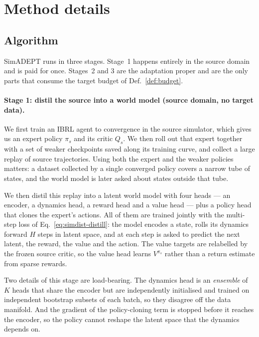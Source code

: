 \section{Method details}
\label{app:method}

\subsection{Algorithm}
\label{app:algorithm}

SimADEPT runs in three stages. Stage~1 happens entirely in the source domain and
is paid for once. Stages~2 and 3 are the adaptation proper and are the only
parts that consume the target budget of Def.~\ref{def:budget}.

\paragraph{Stage 1: distil the source into a world model (source domain, no
target data).}
We first train an IBRL agent to convergence in the source simulator, which gives
us an expert policy $\pi_s$ and its critic $Q_s$. We then roll out that expert
together with a set of weaker checkpoints saved along its training curve, and
collect a large replay of source trajectories. Using both the expert and the
weaker policies matters: a dataset collected by a single converged policy covers
a narrow tube of states, and the world model is later asked about states outside
that tube.

We then distil this replay into a latent world model with four heads --- an
encoder, a dynamics head, a reward head and a value head --- plus a policy head
that clones the expert's actions. All of them are trained jointly with the
multi-step loss of Eq.~\ref{eq:simdist-distill}: the model encodes a state,
rolls its dynamics forward $H$ steps in latent space, and at each step is asked
to predict the next latent, the reward, the value and the action. The value
targets are relabelled by the frozen source critic, so the value head learns
$V^{\pi_s}$ rather than a return estimate from sparse rewards.

Two details of this stage are load-bearing. The dynamics head is an
\emph{ensemble} of $K$ heads that share the encoder but are independently
initialised and trained on independent bootstrap subsets of each batch, so they
disagree off the data manifold. And the gradient of the policy-cloning term is
stopped before it reaches the encoder, so the policy cannot reshape the latent
space that the dynamics depends on.

